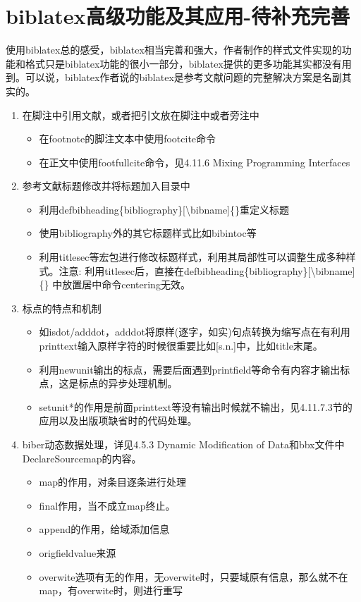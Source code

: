 \section{biblatex高级功能及其应用-待补充完善}
使用biblatex总的感受，biblatex相当完善和强大，作者制作的样式文件实现的功能和格式只是biblatex功能的很小一部分，biblatex提供的更多功能其实都没有用到。可以说，biblatex作者说的biblatex是参考文献问题的完整解决方案是名副其实的。
\begin{enumerate}

  \item 在脚注中引用文献，或者把引文放在脚注中或者旁注中
  \begin{itemize}
    \item 在footnote的脚注文本中使用footcite命令
    \item 在正文中使用footfullcite命令，见4.11.6 Mixing Programming Interfaces
  \end{itemize}

  \item 参考文献标题修改并将标题加入目录中
  \begin{itemize}
    \item 利用defbibheading\{bibliography\}[\textbackslash bibname]\{\}重定义标题
    \item 使用bibliography外的其它标题样式比如bibintoc等
    \item 利用titlesec等宏包进行修改标题样式，利用其局部性可以调整生成多种样式。注意: 利用titlesec后，直接在defbibheading\{bibliography\}[\textbackslash bibname]\{\} 中放置居中命令centering无效。
  \end{itemize}

  \item 标点的特点和机制
  \begin{itemize}
    \item 如isdot/adddot，adddot将原样(逐字，如实)句点转换为缩写点在有利用printtext输入原样字符的时候很重要比如[s.n.]中，比如title末尾。
    \item 利用newunit输出的标点，需要后面遇到printfield等命令有内容才输出标点，这是标点的异步处理机制。
    \item setunit*的作用是前面printtext等没有输出时候就不输出，见4.11.7.3节的应用以及出版项缺省时的代码处理。
  \end{itemize}

  \item biber动态数据处理，详见4.5.3 Dynamic Modification of Data和bbx文件中DeclareSourcemap的内容。
  \begin{itemize}
    \item map的作用，对条目逐条进行处理
    \item final作用，当不成立map终止。
    \item append的作用，给域添加信息
    \item origfieldvalue来源
    \item overwite选项有无的作用，无overwite时，只要域原有信息，那么就不在map，有overwite时，则进行重写
  \end{itemize}


\end{enumerate}
